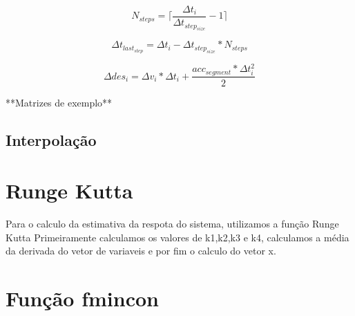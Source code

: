 \begin{equation}
    \label{eq:N_steps}
    N_{steps} = \lceil\frac{\Delta t_i}{\Delta t_{step_{size}}}-1\rceil
\end{equation}

\begin{equation}
    \label{eq:dt_interpol_last_step}
    \Delta t_{last_{step}}= \Delta t_i - \Delta t_{step_{size}}*N_{steps} 
\end{equation}

\begin{equation}
    \label{eq:delta_des_interpol}
    \Delta des_i = \Delta v_i*\Delta t_i+ \frac{acc_{segment}*\Delta t_i^2}{2} 
\end{equation}


**Matrizes de exemplo**



\subsection{Interpolação}

\section{Runge Kutta}



    




Para o calculo da estimativa da respota do sistema, utilizamos a função Runge Kutta
Primeiramente calculamos os valores de k1,k2,k3 e k4, calculamos a média da derivada do vetor de variaveis
e por fim o calculo do vetor x.

\section{Função fmincon}

